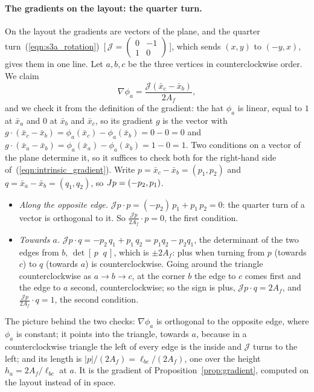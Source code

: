 \paragraph{The gradients on the layout: the quarter turn.} On the layout the gradients are vectors of the plane, and the quarter turn~(\ref{eqn:s3a_rotation})~[\,$\mathcal J = \left(\begin{smallmatrix} 0 & -1 \\ 1 & 0\end{smallmatrix}\right)$\,], which sends $(x, y)$ to $(-y, x)$, gives them in one line. Let $a, b, c$ be the three vertices in counterclockwise order. We claim
\begin{equation}
\label{eqn:intrinsic_gradient}
\nabla\phi_a = \frac{\mathcal J(\bar x_c - \bar x_b)}{2 A_f} ,
\end{equation}
and we check it from the definition of the gradient: the hat $\phi_a$ is linear, equal to $1$ at $\bar x_a$ and $0$ at $\bar x_b$ and $\bar x_c$, so its gradient $g$ is the vector with $g\cdot(\bar x_c - \bar x_b) = \phi_a(\bar x_c) - \phi_a(\bar x_b) = 0 - 0 = 0$ and $g\cdot(\bar x_a - \bar x_b) = \phi_a(\bar x_a) - \phi_a(\bar x_b) = 1 - 0 = 1$. Two conditions on a vector of the plane determine it, so it suffices to check both for the right-hand side of~(\ref{eqn:intrinsic_gradient}). Write $p = \bar x_c - \bar x_b = (p_1, p_2)$ and $q = \bar x_a - \bar x_b = (q_1, q_2)$, so $\mathcal \mathcal Jp = (-p_2, p_1)$.
\begin{itemize}
\item \emph{Along the opposite edge.} $\mathcal Jp \cdot p = (-p_2)\,p_1 + p_1\,p_2 = 0$: the quarter turn of a vector is orthogonal to it. So $\frac{\mathcal Jp}{2A_f}\cdot p = 0$, the first condition.
\item \emph{Towards $a$.} $\mathcal Jp \cdot q = -p_2\, q_1 + p_1\, q_2 = p_1 q_2 - p_2 q_1$, the determinant of the two edges from $b$, $\det[\,p \;\; q\,]$, which is $\pm 2A_f$: plus when turning from $p$ (towards $c$) to $q$ (towards $a$) is counterclockwise. Going around the triangle counterclockwise as $a \to b \to c$, at the corner $b$ the edge to $c$ comes first and the edge to $a$ second, counterclockwise; so the sign is plus, $\mathcal Jp \cdot q = 2A_f$, and $\frac{\mathcal Jp}{2A_f}\cdot q = 1$, the second condition.
\end{itemize}
The picture behind the two checks: $\nabla\phi_a$ is orthogonal to the opposite edge, where $\phi_a$ is constant; it points into the triangle, towards $a$, because in a counterclockwise triangle the left of every edge is the inside and $\mathcal J$ turns to the left; and its length is $|p|/(2A_f) = \ell_{bc}/(2A_f)$, one over the height $h_a = 2A_f/\ell_{bc}$ at $a$. It is the gradient of Proposition~\ref{prop:gradient}, computed on the layout instead of in space.

